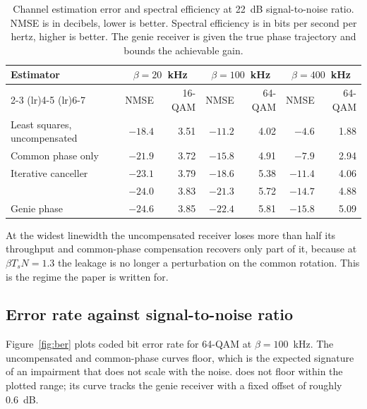 \begin{table}[t]
  \centering
  \footnotesize
  \setlength{\tabcolsep}{4.5pt}
  \caption{Channel estimation error and spectral efficiency at 22~dB
  signal-to-noise ratio. NMSE is in decibels, lower is better. Spectral
  efficiency is in bits per second per hertz, higher is better. The genie
  receiver is given the true phase trajectory and bounds the achievable gain.}
  \label{tab:main}
  \begin{tabular}{l rr rr rr}
    \toprule
    \multirow{2}{*}{Estimator}
      & \multicolumn{2}{c}{$\beta = 20$~kHz}
      & \multicolumn{2}{c}{$\beta = 100$~kHz}
      & \multicolumn{2}{c}{$\beta = 400$~kHz} \\
    \cmidrule(lr){2-3} \cmidrule(lr){4-5} \cmidrule(lr){6-7}
      & NMSE & 16-QAM & NMSE & 64-QAM & NMSE & 64-QAM \\
    \midrule
    Least squares, uncompensated & $-18.4$ & 3.51 & $-11.2$ & 4.02 & $-4.6$  & 1.88 \\
    Common phase only            & $-21.9$ & 3.72 & $-15.8$ & 4.91 & $-7.9$  & 2.94 \\
    Iterative canceller          & $-23.1$ & 3.79 & $-18.6$ & 5.38 & $-11.4$ & 4.06 \\
    \est{}                       & $-24.0$ & 3.83 & $-21.3$ & 5.72 & $-14.7$ & 4.88 \\
    \midrule
    Genie phase                  & $-24.6$ & 3.85 & $-22.4$ & 5.81 & $-15.8$ & 5.09 \\
    \bottomrule
  \end{tabular}
\end{table}

At the widest linewidth the uncompensated receiver loses more than half its
throughput and common-phase compensation recovers only part of it, because at
$\beta T_s N = 1.3$ the leakage is no longer a perturbation on the common
rotation. This is the regime the paper is written for.

\subsection{Error rate against signal-to-noise ratio}

Figure~\ref{fig:ber} plots coded bit error rate for 64-QAM at
$\beta = 100$~kHz. The uncompensated and common-phase curves floor, which is
the expected signature of an impairment that does not scale with the noise.
\est{} does not floor within the plotted range; its curve tracks the genie
receiver with a fixed offset of roughly 0.6~dB.

